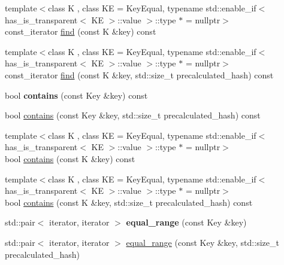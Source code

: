 \begin{DoxyCompactItemize}
\item 
{\footnotesize template$<$class K , class KE  = Key\+Equal, typename std\+::enable\+\_\+if$<$ has\+\_\+is\+\_\+transparent$<$ K\+E $>$\+::value $>$\+::type $\ast$  = nullptr$>$ }\\const\+\_\+iterator \mbox{\hyperlink{classtsl_1_1robin__map_a3e1ec29748d0c94526dde78c26cc9217}{find}} (const K \&key) const
\item 
{\footnotesize template$<$class K , class KE  = Key\+Equal, typename std\+::enable\+\_\+if$<$ has\+\_\+is\+\_\+transparent$<$ K\+E $>$\+::value $>$\+::type $\ast$  = nullptr$>$ }\\const\+\_\+iterator \mbox{\hyperlink{classtsl_1_1robin__map_ad16d4cd56cab57cf373a87aa37b29148}{find}} (const K \&key, std\+::size\+\_\+t precalculated\+\_\+hash) const
\item 
\mbox{\label{classtsl_1_1robin__map_a535c90796bab6221f851dccfadde9d14}} 
bool {\bfseries contains} (const Key \&key) const
\item 
bool \mbox{\hyperlink{classtsl_1_1robin__map_a90a72a463ecf07c88810e54c0db7f37e}{contains}} (const Key \&key, std\+::size\+\_\+t precalculated\+\_\+hash) const
\item 
{\footnotesize template$<$class K , class KE  = Key\+Equal, typename std\+::enable\+\_\+if$<$ has\+\_\+is\+\_\+transparent$<$ K\+E $>$\+::value $>$\+::type $\ast$  = nullptr$>$ }\\bool \mbox{\hyperlink{classtsl_1_1robin__map_a51feaed365e7e64d92fee10dfbe42d26}{contains}} (const K \&key) const
\item 
{\footnotesize template$<$class K , class KE  = Key\+Equal, typename std\+::enable\+\_\+if$<$ has\+\_\+is\+\_\+transparent$<$ K\+E $>$\+::value $>$\+::type $\ast$  = nullptr$>$ }\\bool \mbox{\hyperlink{classtsl_1_1robin__map_a68ddefdb66a67d002acfafd0ef39113a}{contains}} (const K \&key, std\+::size\+\_\+t precalculated\+\_\+hash) const
\item 
\mbox{\label{classtsl_1_1robin__map_a5a93cc710804986ad1d88fa6e1bf0890}} 
std\+::pair$<$ iterator, iterator $>$ {\bfseries equal\+\_\+range} (const Key \&key)
\item 
std\+::pair$<$ iterator, iterator $>$ \mbox{\hyperlink{classtsl_1_1robin__map_a45f4347099fa07f978f5deda43c3d71e}{equal\+\_\+range}} (const Key \&key, std\+::size\+\_\+t precalculated\+\_\+hash)
\item 

\end{DoxyCompactItemize}
